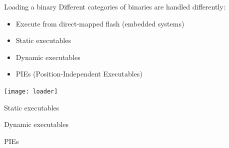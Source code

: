 \documentclass{beamer}
\begin{document}
\begin{frame}{Loading a binary}
  Different categories of binaries are handled differently:
  \begin{itemize}
    \item Execute from direct-mapped flash (embedded systems)
    \item Static executables
    \item Dynamic executables
    \item PIEs (Position-Independent Executables)
  \end{itemize}

  \texttt{[image: loader]}
\end{frame}

\begin{frame}{Static executables}

\end{frame}

\begin{frame}{Dynamic executables}
\end{frame}

\begin{frame}{PIEs}
\end{frame}
\end{document}
